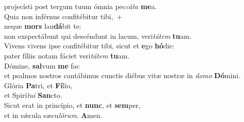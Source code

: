 \evenverse projecísti post tergum tuum ómnia pec\textit{cá}\textit{ta} \textbf{me}a.\\
\oddverse Quia non inférnus confitébitur tibi,~+\\
\oddverse  neque \textbf{mors} lau\textbf{dá}bit te:~\*\\
\oddverse non exspectábunt qui descéndunt in lacum, veri\textit{tá}\textit{tem} \textbf{tu}am.\\
\evenverse Vivens vivens ipse confitébitur tibi, sicut et \textbf{e}go \textbf{hó}die:~\*\\
\evenverse pater fíliis notam fáciet veri\textit{tá}\textit{tem} \textbf{tu}am.\\
\oddverse Dómine, \textbf{sal}vum \textbf{me} fac~\*\\
\oddverse et psalmos nostros cantábimus cunctis diébus vitæ nostræ in \textit{do}\textit{mo} \textbf{Dó}mini.\\
\evenverse Glória \textbf{Pa}tri, et \textbf{Fí}lio,~\*\\
\evenverse et Spirí\textit{tu}\textit{i} \textbf{San}cto.\\
\oddverse Sicut erat in princípio, et \textbf{nunc}, et \textbf{sem}per,~\*\\
\oddverse et in sǽcula sæcu\textit{ló}\textit{rum}. \textbf{A}men.\\
